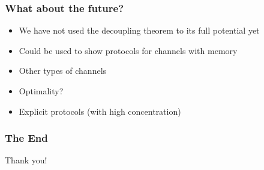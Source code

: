 \documentclass[12pt]{beamer}
\begin{document}
\begin{frame}
	\frametitle{What about the future?}
	\begin{itemize}
	\item We have not used the decoupling theorem to its full potential yet
	\item Could be used to show protocols for channels with memory
	\item Other types of channels
	\item Optimality?
	\item Explicit protocols (with high concentration)
	\end{itemize}
\end{frame}

\begin{frame}
	\frametitle{The End}
	\begin{center}
		\Huge Thank you!
	\end{center}
\end{frame}
\end{document}
